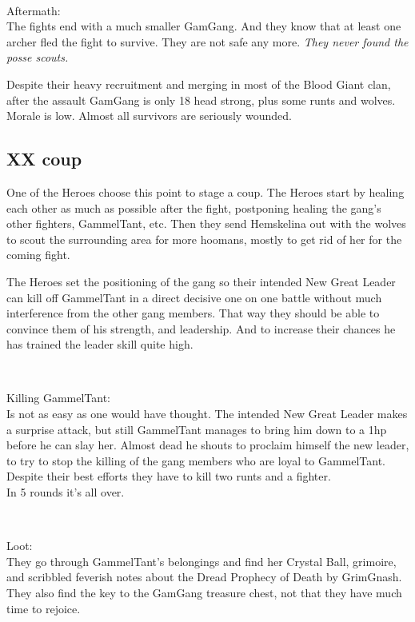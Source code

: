 \

Aftermath:\\
The fights end with a much smaller GamGang. And they know that at least one archer fled the fight to survive. They are not safe any more. \textit{They never found the posse scouts.}

Despite their heavy recruitment and merging in most of the Blood Giant clan, after the assault GamGang is only 18 head strong, plus some runts and wolves. Morale is low. Almost all survivors are seriously wounded.



\subsection*{XX coup}

One of the Heroes choose this point to stage a coup. The Heroes start by healing each other as much as possible after the fight, postponing healing the gang's other fighters, GammelTant, etc. Then they send Hemskelina out with the wolves to scout the surrounding area for more hoomans, mostly to get rid of her for the coming fight.

The Heroes set the positioning of the gang so their intended New Great Leader can kill off GammelTant in a direct decisive one on one battle without much interference from the other gang members. That way they should be able to convince them of his strength, and leadership. And to increase their chances he has trained the leader skill quite high.

\

Killing GammelTant:\\
Is not as easy as one would have thought. The intended New Great Leader makes a surprise attack, but still GammelTant manages to bring him down to a 1hp before he can slay her. Almost dead he shouts to proclaim himself the new leader, to try to stop the killing of the gang members who are loyal to GammelTant. Despite their best efforts they have to kill two runts and a fighter.\\
In 5 rounds it's all over.

\

Loot:\\
They go through GammelTant's belongings and find her Crystal Ball, grimoire, and scribbled feverish notes about the Dread Prophecy of Death by GrimGnash. They also find the key to the GamGang treasure chest, not that they have much time to rejoice.

